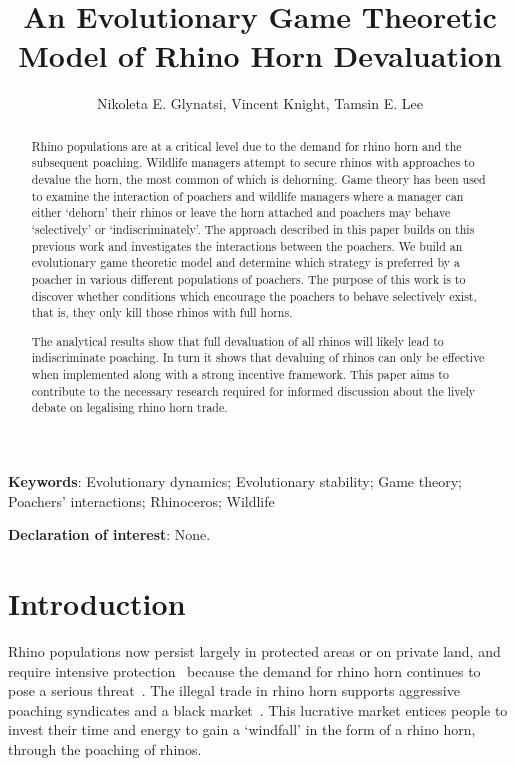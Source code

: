 \documentclass[10pt]{article}
\title{An Evolutionary Game Theoretic Model of Rhino Horn Devaluation}
\author{Nikoleta E. Glynatsi, Vincent Knight, Tamsin E. Lee}
\date{}
\begin{document}
\maketitle

\bigskip
\textbf{Keywords}: Evolutionary dynamics; Evolutionary stability; Game theory; \\
\indent Poachers' interactions; Rhinoceros; Wildlife

\bigskip

\textbf{Declaration of interest}: None.

\newpage
\linenumbers{}
\begin{abstract}

Rhino populations are at a critical level due to the demand for rhino horn and
the subsequent poaching. Wildlife managers attempt to secure rhinos with
approaches to devalue the horn, the most common of which is dehorning. Game theory
has been used to examine the interaction of poachers and wildlife managers where
a manager can either `dehorn' their rhinos or leave the horn attached and poachers
may behave `selectively' or `indiscriminately'. The approach described in this paper
builds on this previous
work and investigates the interactions between the poachers. We build an evolutionary
game theoretic model and determine which strategy is preferred by a poacher in various
different populations of poachers. The purpose of this work is to discover whether
conditions which encourage the poachers to behave selectively exist, that is,
they only kill those rhinos with full horns.

The analytical
results show that full devaluation of all rhinos will likely lead to
indiscriminate poaching. In turn it shows that devaluing of rhinos can only be
effective when implemented along with a strong incentive framework.
This paper aims to
contribute to the necessary research required for informed discussion about the
lively debate on legalising rhino horn trade.

\end{abstract}

\section{Introduction}\label{section:introduction}

Rhino populations now persist largely in protected areas or on private land, and
require intensive protection~\cite{Ferreira2014} because the demand for rhino
horn continues to pose a serious threat~\cite{Amin2006}. The illegal trade in rhino
horn supports aggressive poaching syndicates and a black market~\cite{Nowell1992, Warchol2003}.
This lucrative market entices people to invest their time and energy to gain a
`windfall' in the form of a rhino horn, through the poaching of rhinos.
\end{document}
